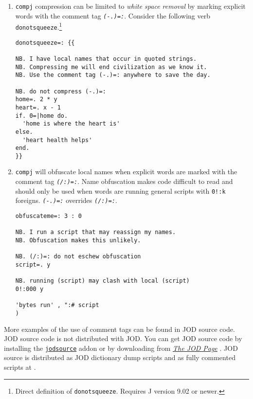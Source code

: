\begin{enumerate}
\item
  \texttt{compj} compression can be limited to \emph{white space removal} by
  marking explicit words with the comment tag \textcolor{CodeComment}{\texttt{\textsl{(-.)=:}}}.
 Consider the following verb \texttt{donotsqueeze}.\footnote{Direct definition of \texttt{donotsqueeze}.  Requires J version 9.02 or newer.} 

\begin{lstlisting}[frame=single,framerule=0pt]
donotsqueeze=: {{

NB. I have local names that occur in quoted strings.
NB. Compressing me will end civilization as we know it.
NB. Use the comment tag (-.)=: anywhere to save the day.

NB. do not compress (-.)=:
home=. 2 * y
heart=. x - 1
if. 0=|home do.
  'home is where the heart is'
else.
  'heart health helps'
end.
}}
\end{lstlisting}

\item
\texttt{compj} will obfuscate local names when explicit words are marked with the comment tag
\textcolor{CodeComment}{\texttt{\textsl{(/:)=:}}}. Name obfuscation
makes code difficult to read and should only be used when words are running general scripts with 
\verb|0!:k| foreigns. 
\textcolor{CodeComment}{\texttt{\textsl{(-.)=:}}} overrides \textcolor{CodeComment}{\texttt{\textsl{(/:)=:}}}.

\begin{lstlisting}[frame=single,framerule=0pt]
obfuscateme=: 3 : 0

NB. I run a script that may reassign my names.
NB. Obfuscation makes this unlikely.

NB. (/:)=: do not eschew obfuscation
script=. y

NB. running (script) may clash with local (script)
0!:000 y

'bytes run' , ":# script
)
\end{lstlisting}

\end{enumerate}

    More examples of the use of comment tags can be found in 
      JOD source code.  JOD source code is not 
     distributed with JOD.  You can get JOD source code by installing
     the  \href{https://www.jsoftware.com/jwiki/Addons/general/jodsource}{\texttt{jodsource}}
     addon or by downloading from 
     \href{https://bakerjd99.wordpress.com/the-jod-page/}{\emph{The JOD Page}} \cite{baker:jodpages}.  
     JOD source is distributed as JOD dictionary dump scripts and as fully commented 
     scripts at .

